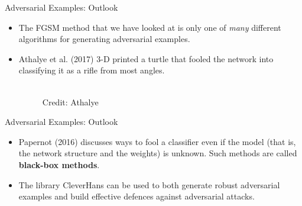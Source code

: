 \documentclass[11pt,compress,t,notes=noshow]{beamer}
\begin{document}
\begin{frame} {Adversarial Examples: Outlook}
  \begin{itemize}
    \item The FGSM method that we have looked at is only one of \textit{many} different algorithms for generating adversarial examples.
    \item Athalye et al. (2017) 3-D printed a turtle that fooled the network into classifying it as a rifle from most angles.
    \begin{figure}
    \centering
      \tiny{\\Credit: Athalye}
  \end{figure}
\end{itemize}
\end{frame}

\begin{frame} {Adversarial Examples: Outlook}
  \begin{itemize}
    \item Papernot (2016) discusses ways to fool a classifier even if the model (that is, the network structure and the weights) is unknown. Such methods are called \textbf{black-box methods}.
    \item The library CleverHans can be used to both generate robust adversarial examples and build effective defences against adversarial attacks.
  \end{itemize}
\end{frame}






\end{document}
